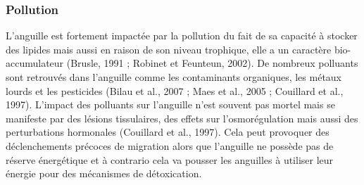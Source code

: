 \documentclass[11pt,titlepage,twoside]{article}\usepackage[]{graphicx}\usepackage[table]{xcolor}
\begin{document}
\subsubsection{Pollution}

L’anguille est fortement impactée par la pollution du fait de sa capacité à stocker des lipides mais aussi en raison de son niveau trophique, elle a un caractère bio-accumulateur (Brusle, 1991 ; Robinet et Feunteun, 2002). De nombreux polluants sont retrouvés dans l’anguille comme les contaminants organiques, les métaux lourds et les pesticides (Bilau et al., 2007 ; Maes et al., 2005 ; Couillard et al., 1997). L’impact des polluants sur l’anguille n’est souvent pas mortel mais se manifeste par des lésions tissulaires, des effets sur l’osmorégulation mais aussi des perturbations hormonales (Couillard et al., 1997). Cela peut provoquer des déclenchements précoces de migration alors que l’anguille ne possède pas de réserve énergétique et à contrario cela va pousser les anguilles à utiliser leur énergie pour des mécanismes de détoxication.





\normalsize
\null
\vfill
\end{document}
